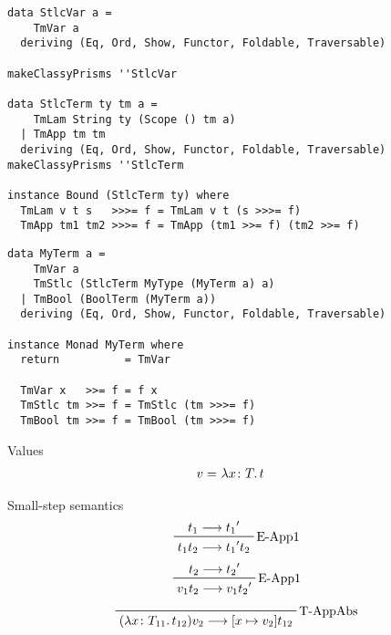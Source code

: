 \documentclass{beamer}
\begin{document}
\begin{frame}[fragile]
\begin{frame}[fragile]
  \begin{verbatim}
data StlcVar a =
    TmVar a
  deriving (Eq, Ord, Show, Functor, Foldable, Traversable)

makeClassyPrisms ''StlcVar

data StlcTerm ty tm a =
    TmLam String ty (Scope () tm a)
  | TmApp tm tm
  deriving (Eq, Ord, Show, Functor, Foldable, Traversable)
makeClassyPrisms ''StlcTerm

instance Bound (StlcTerm ty) where
  TmLam v t s   >>>= f = TmLam v t (s >>>= f)
  TmApp tm1 tm2 >>>= f = TmApp (tm1 >>= f) (tm2 >>= f)
  \end{verbatim}  
\end{frame}

\begin{frame}[fragile]
  \begin{verbatim}
data MyTerm a =
    TmVar a
    TmStlc (StlcTerm MyType (MyTerm a) a)
  | TmBool (BoolTerm (MyTerm a))
  deriving (Eq, Ord, Show, Functor, Foldable, Traversable)

instance Monad MyTerm where
  return          = TmVar

  TmVar x   >>= f = f x
  TmStlc tm >>= f = TmStlc (tm >>>= f)
  TmBool tm >>= f = TmBool (tm >>>= f)
  \end{verbatim}  
\end{frame}

\begin{frame}[c]
  Values
  \begin{displaymath}
    \begin{aligned}
v =& \ \lambda x \colon T \ldotp t
    \end{aligned}
  \end{displaymath}
\end{frame}

\begin{frame}
  Small-step semantics
  \begin{displaymath}  
    \prftree[r]{E-App1}
    {t_1 \longrightarrow {t_1}^{\prime} }
    {t_1 t_2 \longrightarrow {t_1}^{\prime} t_2}
  \end{displaymath}  
  \begin{displaymath}  
    \prftree[r]{E-App1}
    {t_2 \longrightarrow {t_2}^{\prime} }
    {v_1 t_2 \longrightarrow v_1 {t_2}^{\prime}}
  \end{displaymath}  
  \begin{displaymath}  
    \prftree[r]{T-AppAbs}
    {(\lambda x \colon T_{11} \ldotp t_{12})v_2 \longrightarrow [x \mapsto v_2]t_{12}}
  \end{displaymath}  
\end{frame}


\end{frame}
\end{document}
